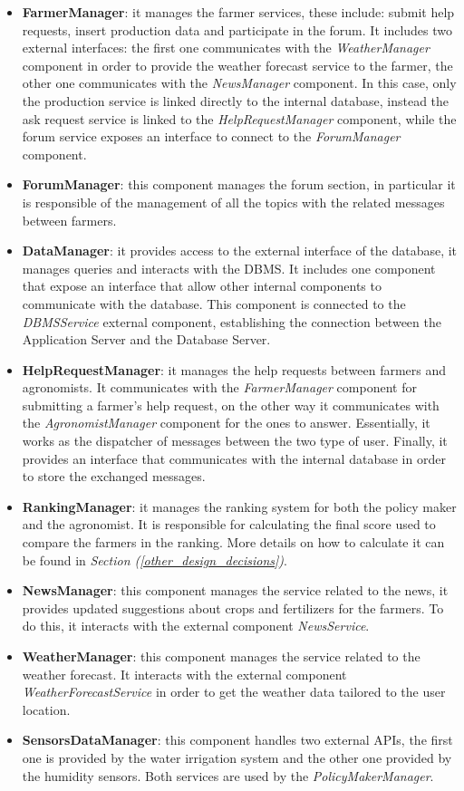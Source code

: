 \documentclass[table, 12pt]{article}
\begin{document}
\begin{itemize}
    \item \textbf{FarmerManager}: it manages the farmer services, these include: submit help requests, insert production data and participate in the forum.
    It includes two external interfaces: the first one communicates with the \textit{WeatherManager} component in order to provide the weather forecast service to the farmer, the other one communicates with the \textit{NewsManager} component.
    In this case, only the production service is linked directly to the internal database, instead the ask request service is linked to the \textit{HelpRequestManager} component, while the forum service exposes an interface to connect to the \textit{ForumManager} component.
    \item \textbf{ForumManager}: this component manages the forum section, in particular it is responsible of the management of all the topics with the related messages between farmers.
    \item \textbf{DataManager}: it provides access to the external interface of the database, it manages queries and interacts with the DBMS.
    It includes one component that expose an interface that allow other internal components to communicate with the database.
    This component is connected to the \textit{DBMSService} external component, establishing the connection between the Application Server and the Database Server.
    \item \textbf{HelpRequestManager}: it manages the help requests between farmers and agronomists.
    It communicates with the \textit{FarmerManager} component for submitting a farmer's help request, on the other way it communicates with the \textit{AgronomistManager} component for the ones to answer. Essentially, it works as the dispatcher of messages between the two type of user.
    Finally, it provides an interface that communicates with the internal database in order to store the exchanged messages.
    \item \textbf{RankingManager}: it manages the ranking system for both the policy maker and the agronomist.
    It is responsible for calculating the final score used to compare the farmers in the ranking.
    More details on how to calculate it can be found in \textit{Section (\ref{other_design_decisions})}.
    \item \textbf{NewsManager}: this component manages the service related to the news, it provides updated suggestions about crops and fertilizers for the farmers.
    To do this, it interacts with the external component \textit{NewsService}.
    \item \textbf{WeatherManager}: this component manages the service related to the weather forecast.
    It interacts with the external component \textit{WeatherForecastService} in order to get the weather data tailored to the user location.
    \item \textbf{SensorsDataManager}: this component handles two external APIs, the first one is provided by the water irrigation system and the other one provided by the humidity sensors.
    Both services are used by the \textit{PolicyMakerManager}.
\end{itemize}
\end{document}
